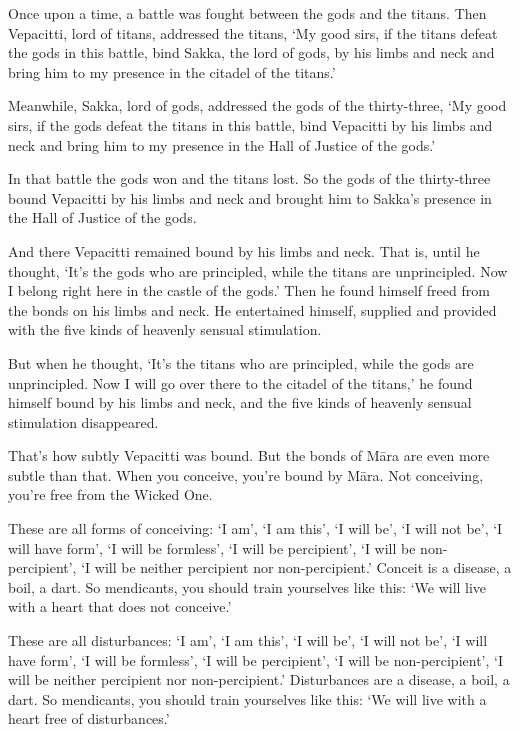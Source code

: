 \documentclass[12pt,openany]{book}%
\begin{document}
Once upon a time, a battle was fought between the gods and the titans. Then Vepacitti, lord of titans, addressed the titans, ‘My good sirs, if the titans defeat the gods in this battle, bind Sakka, the lord of gods, by his limbs and neck and bring him to my presence in the citadel of the titans.’ 

Meanwhile, Sakka, lord of gods, addressed the gods of the thirty-three, ‘My good sirs, if the gods defeat the titans in this battle, bind Vepacitti by his limbs and neck and bring him to my presence in the Hall of Justice of the gods.’ 

In that battle the gods won and the titans lost. So the gods of the thirty-three bound Vepacitti by his limbs and neck and brought him to Sakka’s presence in the Hall of Justice of the gods. 

And there Vepacitti remained bound by his limbs and neck. That is, until he thought, ‘It’s the gods who are principled, while the titans are unprincipled. Now I belong right here in the castle of the gods.’ Then he found himself freed from the bonds on his limbs and neck. He entertained himself, supplied and provided with the five kinds of heavenly sensual stimulation. 

But when he thought, ‘It’s the titans who are principled, while the gods are unprincipled. Now I will go over there to the citadel of the titans,’ he found himself bound by his limbs and neck, and the five kinds of heavenly sensual stimulation disappeared. 

That’s how subtly Vepacitti was bound. But the bonds of \textsanskrit{Māra} are even more subtle than that. When you conceive, you’re bound by \textsanskrit{Māra}. Not conceiving, you’re free from the Wicked One. 

These are all forms of conceiving: ‘I am’, ‘I am this’, ‘I will be’, ‘I will not be’, ‘I will have form’, ‘I will be formless’, ‘I will be percipient’, ‘I will be non-percipient’, ‘I will be neither percipient nor non-percipient.’ Conceit is a disease, a boil, a dart. So mendicants, you should train yourselves like this: ‘We will live with a heart that does not conceive.’ 

These are all disturbances: ‘I am’, ‘I am this’, ‘I will be’, ‘I will not be’, ‘I will have form’, ‘I will be formless’, ‘I will be percipient’, ‘I will be non-percipient’, ‘I will be neither percipient nor non-percipient.’ Disturbances are a disease, a boil, a dart. So mendicants, you should train yourselves like this: ‘We will live with a heart free of disturbances.’ 
\end{document}
